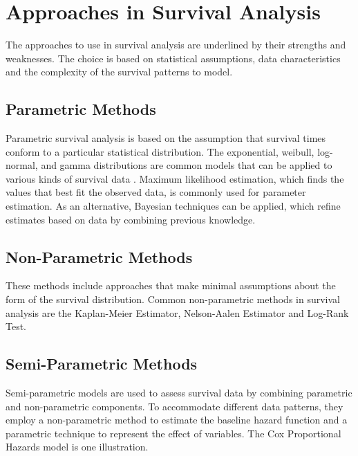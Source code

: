 \documentclass[doublespacing,12pt]{report}
\begin{document}
\section{Approaches in Survival Analysis}

The approaches to use in survival analysis are underlined by their strengths and weaknesses. The choice is based on statistical assumptions, data characteristics and the complexity of the survival patterns to model.

\subsection{Parametric Methods}

Parametric survival analysis is based on the assumption that survival times conform to a particular statistical distribution. The exponential, weibull, log-normal, and gamma distributions are common models that can be applied to various kinds of survival data \cite{aalen20021}. Maximum likelihood estimation, which finds the values that best fit the observed data, is commonly used for parameter estimation. As an alternative, Bayesian techniques can be applied, which refine estimates based on data by combining previous knowledge.

\subsection{Non-Parametric Methods}

These methods include approaches that make minimal assumptions about the form of the survival distribution. Common non-parametric methods in survival analysis are the Kaplan-Meier Estimator, Nelson-Aalen Estimator and Log-Rank Test.

\subsection{Semi-Parametric Methods}

Semi-parametric models are used to assess survival data by combining parametric and non-parametric components. To accommodate different data patterns, they employ a non-parametric method to estimate the baseline hazard function and a parametric technique to represent the effect of variables. The Cox Proportional Hazards model is one illustration.
\end{document}
